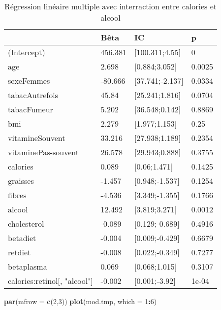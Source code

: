\documentclass[]{article}
\newenvironment{Shaded}{\begin{snugshade}}{\end{snugshade}}
\newcommand{\KeywordTok}[1]{\textcolor[rgb]{0.13,0.29,0.53}{\textbf{#1}}}
\newcommand{\DataTypeTok}[1]{\textcolor[rgb]{0.13,0.29,0.53}{#1}}
\newcommand{\DecValTok}[1]{\textcolor[rgb]{0.00,0.00,0.81}{#1}}
\newcommand{\OperatorTok}[1]{\textcolor[rgb]{0.81,0.36,0.00}{\textbf{#1}}}
\newcommand{\NormalTok}[1]{#1}
\begin{document}
\begin{table}

\caption{\label{tab:unnamed-chunk-74}Régression linéaire multiple avec interraction entre calories et alcool}
\centering
\begin{tabular}[t]{l|l|l|l}
\hline
  & Bêta & IC & p\\
\hline
\rowcolor[HTML]{BBD2E1}  (Intercept) & 456.381 & [100.311;4.55] & 0\\
\hline
age & 2.698 & [0.884;3.052] & 0.0025\\
\hline
\rowcolor[HTML]{BBD2E1}  sexeFemmes & -80.666 & [37.741;-2.137] & 0.0334\\
\hline
tabacAutrefois & 45.84 & [25.241;1.816] & 0.0704\\
\hline
\rowcolor[HTML]{BBD2E1}  tabacFumeur & 5.202 & [36.548;0.142] & 0.8869\\
\hline
bmi & 2.279 & [1.977;1.153] & 0.25\\
\hline
\rowcolor[HTML]{BBD2E1}  vitamineSouvent & 33.216 & [27.938;1.189] & 0.2354\\
\hline
vitaminePas-souvent & 26.578 & [29.943;0.888] & 0.3755\\
\hline
\rowcolor[HTML]{BBD2E1}  calories & 0.089 & [0.06;1.471] & 0.1425\\
\hline
graisses & -1.457 & [0.948;-1.537] & 0.1254\\
\hline
\rowcolor[HTML]{BBD2E1}  fibres & -4.536 & [3.349;-1.355] & 0.1766\\
\hline
alcool & 12.492 & [3.819;3.271] & 0.0012\\
\hline
\rowcolor[HTML]{BBD2E1}  cholesterol & -0.089 & [0.129;-0.689] & 0.4916\\
\hline
betadiet & -0.004 & [0.009;-0.429] & 0.6679\\
\hline
\rowcolor[HTML]{BBD2E1}  retdiet & -0.008 & [0.022;-0.349] & 0.7277\\
\hline
betaplasma & 0.069 & [0.068;1.015] & 0.3107\\
\hline
\rowcolor[HTML]{BBD2E1}  calories:retinol[, "alcool"] & -0.002 & [0.001;-3.92] & 1e-04\\
\hline
\end{tabular}
\end{table}

\begin{Shaded}
\begin{Highlighting}[]
\KeywordTok{par}\NormalTok{(}\DataTypeTok{mfrow =} \KeywordTok{c}\NormalTok{(}\DecValTok{2}\NormalTok{,}\DecValTok{3}\NormalTok{))}
\KeywordTok{plot}\NormalTok{(mod.tmp, }\DataTypeTok{which =} \DecValTok{1}\OperatorTok{:}\DecValTok{6}\NormalTok{)}
\end{Highlighting}
\end{Shaded}
\end{document}
